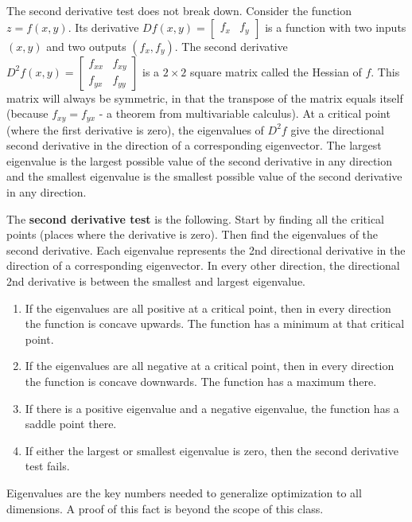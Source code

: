 The second derivative test does not break down. Consider the function $z=f(x,y)$. 
Its derivative $Df(x,y) = \begin{bmatrix}f_x&f_y\end{bmatrix}$ is a function with two inputs $(x,y)$ and two outputs $(f_x,f_y)$. 
The second derivative {$D^2f (x,y)= \begin{bmatrix}f_{xx}&f_{xy}\\f_{yx}&f_{yy}\end{bmatrix} $} is a {$2\times 2$} square matrix called the Hessian of $f$. 
This matrix will always be symmetric, in that the transpose of the matrix equals itself (because $f_{xy}=f_{yx}$ - a theorem from multivariable calculus).  
At a critical point (where the first derivative is zero), the eigenvalues of $D^2f$ give the directional second derivative in the direction of a corresponding eigenvector. 
The largest eigenvalue is the largest possible value of the second derivative in any direction and the smallest eigenvalue is the smallest possible value of the second derivative in any direction. 

The \textbf{second derivative test}  is the following. Start by finding all the critical points (places where the derivative is zero). Then find the eigenvalues of the second derivative. Each eigenvalue represents the 2nd directional derivative in the direction of a corresponding eigenvector. In every other direction, the directional 2nd derivative is between the smallest and largest eigenvalue.  
\begin{enumerate}
	\item If the eigenvalues are all positive at a critical point, then in every direction the function is concave upwards. The function has a minimum at that critical point.
	\item If the eigenvalues are all negative at a critical point, then in every direction the function is concave downwards. The function has a maximum there.
	\item If there is a positive eigenvalue and a negative eigenvalue, the function has a saddle point there.  
	\item If either the largest or smallest eigenvalue is zero, then the second derivative test fails. 
\end{enumerate}
Eigenvalues are the key numbers needed to generalize optimization to all dimensions. A proof of this fact is beyond the scope of this class. 

